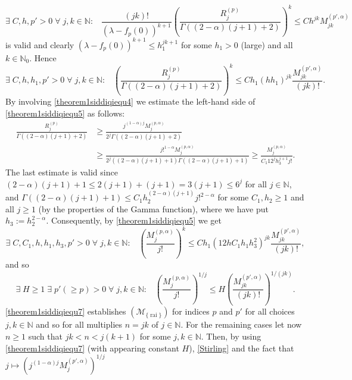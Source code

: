 \documentclass[11pt,a4paper]{article}
\theoremstyle{plain}
\theoremstyle{definition}
\newcommand{\NN}{\mathbb{N}}
\let\on=\operatorname
\begin{document}
$$\exists\;C,h,p'>0\;\forall\;j,k\in\NN:\;\;\;\frac{(jk)!}{(\lambda-f_{p}(0))^{k+1}}\left(\frac{R^{(p)}_j}{{\Gamma((2-\alpha)(j+1)+2)}}\right)^{k}\le Ch^{jk}M^{(p',\alpha)}_{jk}$$
is valid and clearly $(\lambda-f_{p}(0))^{k+1}\le h_1^{jk+1}$ for some $h_1>0$ (large) and all $k\in\NN_0$. Hence
\begin{equation}\label{theorem1siddiqiequ5}
	 \exists\;C,h,h_1,p'>0\;\forall\;j,k\in\NN:\;\;\;\left(\frac{R^{(p)}_j}{{\Gamma((2-\alpha)(j+1)+2)}}\right)^{k}\le Ch_1(hh_1)^{jk}\frac{M^{(p',\alpha)}_{jk}}{(jk)!}.
\end{equation}
By involving \eqref{theorem1siddiqiequ4} we estimate the left-hand side of \eqref{theorem1siddiqiequ5} as follows:
\begin{align*}
\frac{R^{(p)}_j}{{\Gamma((2-\alpha)(j+1)+2)}}& \ge\frac{j^{(1-\alpha)j}M^{(p,\alpha)}_j}{2^j{\Gamma((2-\alpha)(j+1)+2)}}\\ &\ge\frac{j!^{1-\alpha}M^{(p,\alpha)}_j}{2^j((2-\alpha)(j+1)+1){\Gamma((2-\alpha)(j+1)+1)}} \ge\frac{M^{(p,\alpha)}_j}{C_1{12}^jh_3^{j+1}j!}.
\end{align*}
The last estimate is valid since $(2-\alpha)(j+1)+1\le2(j+1)+(j+1)=3(j+1)\le{6}^j$ for all $j\in\NN$, and ${\Gamma((2-\alpha)(j+1)+1)}\le C_1h_2^{(2-\alpha)(j+1)}j!^{2-\alpha}$ for some $C_1,h_2\ge 1$ and all $j\ge 1$ (by the properties of the Gamma function), where we have put $h_3:=h_2^{2-\alpha}$. Consequently, by \eqref{theorem1siddiqiequ5} we get
\begin{equation*}%
	 \exists\;C,C_1,h,h_1,h_3,p'>0\;\forall\;j,k\in\NN:\;\;\;\left(\frac{M^{(p,\alpha)}_j}{j!}\right)^k\le Ch_1({12}hC_1h_1h^2_3)^{jk}\frac{M^{(p',\alpha)}_{jk}}{(jk)!},
\end{equation*}
and so
\begin{equation}\label{theorem1siddiqiequ7}
	\exists\;H\ge 1\;\exists\;p'(\ge p)>0\;\forall\;j,k\in\NN:\;\;\;\left(\frac{M^{(p,\alpha)}_j}{j!}\right)^{1/j}\le H\left(\frac{M^{(p',\alpha)}_{jk}}{(jk)!}\right)^{1/(jk)}.
\end{equation}
\eqref{theorem1siddiqiequ7} establishes \hyperlink{R-rai}{$(\mathcal{M}_{\{\on{rai}\}})$} for indices $p$ and $p'$ for all choices $j,k\in\NN$ and so for all multiplies $n=jk$ of $j\in\NN$. For the remaining cases let now $n\ge 1$ such that $jk<n<j(k+1)$ for some $j,k\in\NN$. Then, by using \eqref{theorem1siddiqiequ7} (with appearing constant $H$), \eqref{Stirling} and the fact that $j\mapsto(j^{(1-\alpha)j}M^{(p',\alpha)}_j)^{1/j}$
\end{document}
